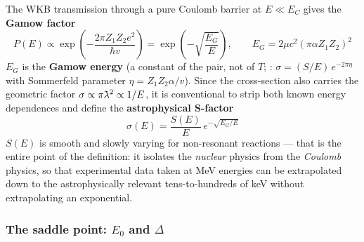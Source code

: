 The WKB transmission through a pure Coulomb barrier at $E \ll E_C$ gives the
\textbf{Gamow factor}
%
\begin{equation}
P(E) \propto \exp\!\left(-\frac{2\pi Z_1Z_2 e^2}{\hbar v}\right)
      = \exp\!\left(-\sqrt{\frac{E_G}{E}}\right),
\qquad
E_G = 2\mu c^2 (\pi \alpha Z_1 Z_2)^2
\label{eq:gamowfactor}
\end{equation}
%
$E_G$ is the \textbf{Gamow energy} (a constant of the pair, not of $T$;
\citealp{adelberger2011}: $\sigma = (S/E)\,e^{-2\pi\eta}$ with Sommerfeld
parameter $\eta = Z_1Z_2\alpha/v$). Since the cross-section also carries the
geometric factor $\sigma \propto \pi\lbar^2 \propto 1/E$, it is
conventional to strip both known energy dependences and define the
\textbf{astrophysical S-factor}
%
\begin{equation}
\sigma(E) = \frac{S(E)}{E}\,e^{-\sqrt{E_G/E}}
\label{eq:sfactor}
\end{equation}
%
$S(E)$ is smooth and slowly varying for non-resonant reactions
\citep{adelberger2011} --- that is the entire point of the definition: it
isolates the \emph{nuclear} physics from the \emph{Coulomb} physics, so that
experimental data taken at MeV energies can be extrapolated down to the
astrophysically relevant tens-to-hundreds of keV without extrapolating an
exponential.

\subsubsection{The saddle point: \texorpdfstring{$E_0$ and $\Delta$}{E0 and Delta}}
\label{sec:saddle}

